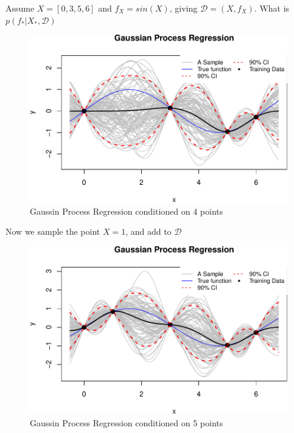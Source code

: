 \documentclass[]{elsarticle} %
\begin{document}
Assume \(X=[0,3,5,6]\) and \(f_X=sin(X)\), giving \(\mathcal{D}=(X,f_X)\).
What is \(p(f_\ast|X_\ast,\mathcal{D})\)

\begin{figure}
\includegraphics[width=1\linewidth]{0_Paper1_main_files/figure-latex/guass-1-1} \caption{Gaussin Process Regression conditioned on 4 points}\label{fig:guass-1}
\end{figure}

Now we sample the point \(X=1\), and add to \(\mathcal{D}\)

\begin{figure}

{\centering \includegraphics[width=1\linewidth,height=0.5\textheight]{0_Paper1_main_files/figure-latex/guass-2-1} 

}

\caption{Gaussin Process Regression conditioned on 5 points}\label{fig:guass-2}
\end{figure}
\end{document}
